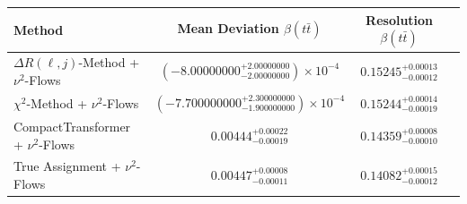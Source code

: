     \begin{tabular}{lccc}
        \toprule
        Method & Mean Deviation $\beta(t\bar{t})$ & Resolution $\beta(t\bar{t})$ \\
        \midrule
        $\Delta R(\ell,j)$-Method + $\nu^2$-Flows & $(-8.00000000^{+2.00000000}_{-2.00000000})\times 10^{-4}$ & $0.15245^{+0.00013}_{-0.00012}$ \\
        $\chi^2$-Method + $\nu^2$-Flows & $(-7.700000000^{+2.300000000}_{-1.900000000})\times 10^{-4}$ & $0.15244^{+0.00014}_{-0.00019}$ \\
        CompactTransformer + $\nu^2$-Flows & $0.00444^{+0.00022}_{-0.00019}$ & $0.14359^{+0.00008}_{-0.00010}$ \\
        True Assignment + $\nu^2$-Flows & $0.00447^{+0.00008}_{-0.00011}$ & $0.14082^{+0.00015}_{-0.00012}$ \\
        \bottomrule
    \end{tabular}